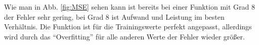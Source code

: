 Wie man in Abb. \ref{fig:MSE} sehen kann ist bereits bei einer Funktion mit Grad 8 der Fehler sehr gering, bei Grad 8 ist  
Aufwand und Leistung im besten Verhältnis. Die Funktion ist für die Trainingswerte 
perfekt angepasst, allerdings wird durch das ``Overfitting'' für alle anderen Werte der Fehler wieder größer.
